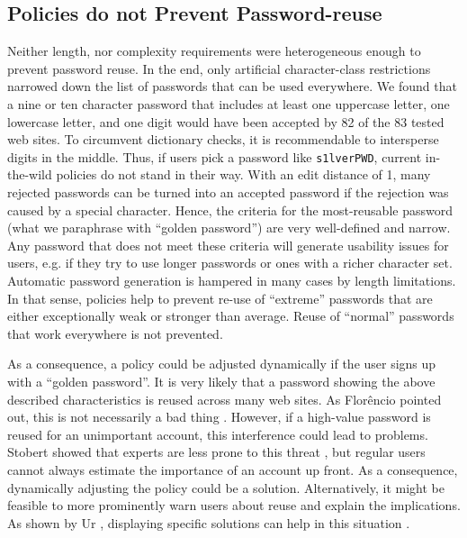 \subsection{Policies do not Prevent Password-reuse}
Neither length, nor complexity requirements were heterogeneous enough to prevent password reuse. In the end, only artificial character-class restrictions narrowed down the list of passwords that can be used everywhere. We found that a nine or ten character password that includes at least one uppercase letter, one lowercase letter, and one digit would have been accepted by 82 of the 83 tested web sites. To circumvent dictionary checks, it is recommendable to intersperse digits in the middle. Thus, if users pick a password like \texttt{s1lverPWD}, current in-the-wild policies do not stand in their way. With an edit distance of 1, many rejected passwords can be turned into an accepted password if the rejection was caused by a special character. Hence, the criteria for the most-reusable password (what we paraphrase with ``golden password'') are very well-defined and narrow. Any password that does not meet these criteria will generate usability issues for users, e.g. if they try to use longer passwords or ones with a richer character set. Automatic password generation is hampered in many cases by length limitations. In that sense, policies help to prevent re-use of ``extreme'' passwords that are either exceptionally weak or stronger than average. Reuse of ``normal'' passwords that work everywhere is not prevented.


As a consequence, a policy could be adjusted dynamically if the user signs up with a ``golden password''. It is very likely that a password showing the above described characteristics is reused across many web sites. As Florêncio \etal pointed out, this is not necessarily a bad thing \cite{Florencio2014PasswordPortfoliosFiniteUser}. However, if a high-value password is reused for an unimportant account, this interference could lead to problems. Stobert showed that experts are less prone to this threat \cite{Stobert2015ExpertPassword}, but regular users cannot always estimate the importance of an account up front. As a consequence, dynamically adjusting the policy could be a solution. Alternatively, it might be feasible to more prominently warn users about reuse and explain the implications. As shown by Ur \etal, displaying specific solutions can help in this situation \cite{Ur2017DataDrivenPWMeter}. 

